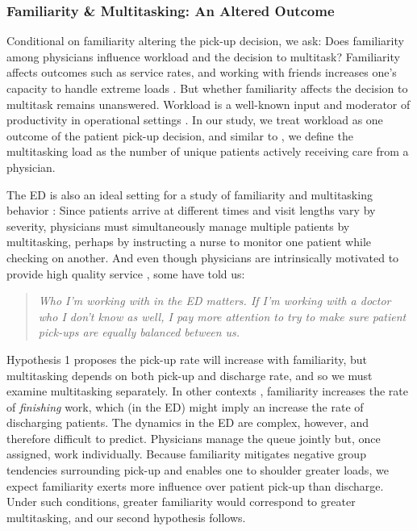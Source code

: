  \subsubsection{Familiarity \& Multitasking: An Altered Outcome} 
 Conditional on familiarity altering the pick-up decision, we ask: Does familiarity among physicians influence workload and the decision to multitask? Familiarity affects outcomes such as service rates, and working with friends increases one's capacity to handle extreme loads \citep{Bandiera2010,Hamilton2003}. But whether familiarity affects the decision to multitask remains unanswered. Workload is a well-known input and moderator of productivity in operational settings \citep[e.g.,][]{Schultz1998,Delasay2018}. In our study, we treat workload as one outcome of the patient pick-up decision, and similar to \cite{KC2014}, we define the multitasking load as the number of unique patients actively receiving care from a physician.
 
 The ED is also an ideal setting for a study of familiarity and multitasking behavior \citep[p. 169]{KC2014}: Since patients arrive at different times and visit lengths vary by severity, physicians must simultaneously manage multiple patients by multitasking, perhaps by instructing a nurse to monitor one patient while checking on another. And even though physicians are intrinsically motivated to provide high quality service \citep{Madara2015}, some have told us:
 \begin{quote}\textit{Who I'm working with in the ED matters. If I’m working with a doctor who I don’t know as well, I pay more attention to try to make sure patient pick-ups are equally balanced between us.} \end{quote}
 Hypothesis 1 proposes the pick-up rate will increase with familiarity, but multitasking depends on both pick-up and discharge rate, and so we must examine multitasking separately. In other contexts \citep[e.g.,][]{Aksin2020,Reagans2005,Avgerinos2017}, familiarity increases the rate of \textit{finishing} work, which (in the ED) might imply an increase the rate of discharging patients. The dynamics in the ED are complex, however, and therefore difficult to predict. Physicians manage the queue jointly but, once assigned, work individually. Because familiarity mitigates negative group tendencies surrounding pick-up and enables one to shoulder greater loads, we expect familiarity exerts more influence over patient pick-up than discharge. Under such conditions, greater familiarity would correspond to greater multitasking, and our second hypothesis follows.
 
